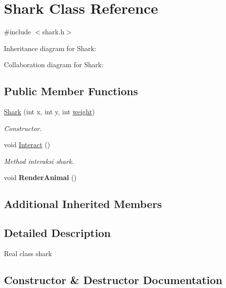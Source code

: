 \hypertarget{classShark}{}\section{Shark Class Reference}
\label{classShark}


{\ttfamily \#include $<$shark.\+h$>$}



Inheritance diagram for Shark\+:


Collaboration diagram for Shark\+:
\subsection*{Public Member Functions}
\begin{DoxyCompactItemize}
\item 
\hyperlink{classShark_a3cce16ea6513c824ef0ab04ee2ff49eb}{Shark} (int x, int y, int \hyperlink{classAnimal_a9a3b22f243f7109c57f36b3c660feb6e}{weight})
\begin{DoxyCompactList}\small\item\em Constructor. \end{DoxyCompactList}\item 
void \hyperlink{classShark_a1931860a22423b2a13797b3265c99cf0}{Interact} ()\hypertarget{classShark_a1931860a22423b2a13797b3265c99cf0}{}\label{classShark_a1931860a22423b2a13797b3265c99cf0}

\begin{DoxyCompactList}\small\item\em Method interaksi shark. \end{DoxyCompactList}\item 
void {\bfseries Render\+Animal} ()\hypertarget{classShark_a982763780368f5c155d4624ab188dab9}{}\label{classShark_a982763780368f5c155d4624ab188dab9}

\end{DoxyCompactItemize}
\subsection*{Additional Inherited Members}


\subsection{Detailed Description}
Real class shark 

\subsection{Constructor \& Destructor Documentation}
